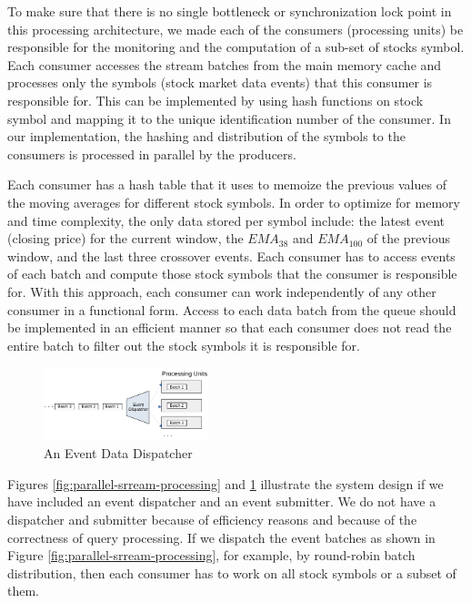 To make sure that there is no single bottleneck or synchronization lock point in this processing architecture, we made each of the consumers
(processing units) be responsible for the monitoring and the computation of a sub-set of stocks symbol. Each consumer accesses the stream batches
from the main memory cache and processes only the symbols (stock market data events) that this consumer is responsible for.
This can be implemented by using hash functions on stock symbol and mapping it to the unique identification number of the consumer.
In our implementation, the hashing and distribution of the symbols to the consumers is processed in parallel by the producers.

Each consumer has a hash table that it uses to memoize the previous values of the moving averages for different stock symbols. In order to optimize 
for memory and time complexity, the only data stored per symbol include: the latest event (closing price) for the current window, the $EMA_{38}$ and $EMA_{100}$ of 
the previous window, and the last three crossover events.
Each consumer has to access events of each batch and compute those stock symbols that the consumer is responsible for. With this approach, each consumer 
can work independently of any other consumer in a functional form. Access to each data batch from the queue should be implemented in an efficient manner so that each 
consumer does not read the entire batch to filter out the stock symbols it is responsible for.



\begin{figure}
    \begin{center}
        \includegraphics[width=0.43\textwidth]{./images/Stream-Batch-Distributions}
        \caption{An Event Data Dispatcher}
        \label{fig:batch-distributions}
    \end{center}
\end{figure}

Figures \ref{fig:parallel-srream-processing} and \ref{fig:batch-distributions} illustrate the system design if we have included an event dispatcher and 
an event submitter. We do not have a dispatcher and submitter because of efficiency reasons and because of the correctness of query processing. If we dispatch the 
event batches as shown in Figure \ref{fig:parallel-srream-processing}, for example, by round-robin batch distribution, then each consumer has to work on all stock symbols or a subset of them.

